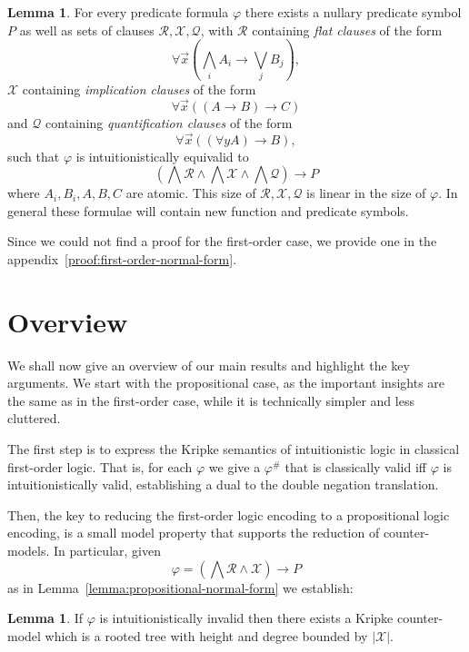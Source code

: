 \documentclass{easychair}
\theoremstyle{definition}
\theoremstyle{definition}
\theoremstyle{definition}
\newtheorem{lemma}[theorem]{Lemma}
\theoremstyle{definition}
\theoremstyle{definition}
\theoremstyle{definition}
\theoremstyle{definition}
\begin{document}
\begin{lemma}\label{lemma:first-order-normal-form}
	For every predicate formula $\varphi$ there exists a nullary predicate symbol $P$ as well as sets of clauses $\mathcal R,\mathcal X, \mathcal Q$, with $\mathcal R$ containing \emph{flat clauses} of the form
	$$\forall \vec x\left(\bigwedge_i A_i\to \bigvee_jB_j\right),$$
	$\mathcal X$ containing \emph{implication clauses} of the form
	$$\forall \vec x\left((A\to B)\to C\right)$$
	and $\mathcal Q$ containing \emph{quantification clauses} of the form
	$$\forall\vec x\left((\forall y A)\to B\right),$$
	such that $\varphi$ is intuitionistically equivalid to
	$$\left(\bigwedge\mathcal R\wedge\bigwedge \mathcal X\wedge\bigwedge\mathcal Q\right)\to P$$where $A_i, B_i, A, B, C$ are atomic. This size of $\mathcal R, \mathcal X, \mathcal Q$ is linear in the size of $\varphi$. In general these formulae will contain new function and predicate symbols.
\end{lemma}

Since we could not find a proof for the first-order case, we provide one in the appendix~\ref{proof:first-order-normal-form}.

\section{Overview}
\label{sec:overview}

We shall now give an overview of our main results and highlight the key arguments.
We start with the propositional case, as the important insights are the same as in the first-order case, while it is technically simpler and less cluttered.

The first step is to express the Kripke semantics of intuitionistic logic in classical first-order logic.
That is, for each $\varphi$ we give a $\varphi^\#$ that is classically valid iff $\varphi$ is intuitionistically valid, establishing a dual to the double negation translation.

Then, the key to reducing the first-order logic encoding to a propositional logic encoding, is a small model property that supports the reduction of counter-models.
In particular, given $$\varphi = \left(\bigwedge\mathcal R\wedge\mathcal X\right)\to P$$ as in Lemma~\ref{lemma:propositional-normal-form} we establish:

\begin{lemma}
	If $\varphi$ is intuitionistically invalid then there exists a Kripke counter-model which is a rooted tree with height and degree bounded by $|\mathcal X|$.
\end{lemma}
\end{document}
